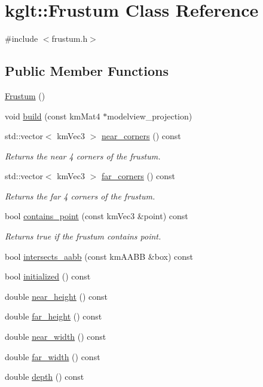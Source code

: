 \hypertarget{classkglt_1_1_frustum}{\section{kglt\-:\-:Frustum Class Reference}
\label{classkglt_1_1_frustum}
}


{\ttfamily \#include $<$frustum.\-h$>$}

\subsection*{Public Member Functions}
\begin{DoxyCompactItemize}
\item 
\hyperlink{classkglt_1_1_frustum_a830b594468c71f8d731b6ea89273225b}{Frustum} ()
\item 
void \hyperlink{classkglt_1_1_frustum_a4ee45311da6e2437dff483bf29f3171c}{build} (const km\-Mat4 $\ast$modelview\-\_\-projection)
\item 
std\-::vector$<$ km\-Vec3 $>$ \hyperlink{classkglt_1_1_frustum_a1cd3a93ac9f35d52c9d598a17eab7d0e}{near\-\_\-corners} () const 
\begin{DoxyCompactList}\small\item\em Returns the near 4 corners of the frustum. \end{DoxyCompactList}\item 
std\-::vector$<$ km\-Vec3 $>$ \hyperlink{classkglt_1_1_frustum_ab892628013e107e1769d9188e5e3b100}{far\-\_\-corners} () const 
\begin{DoxyCompactList}\small\item\em Returns the far 4 corners of the frustum. \end{DoxyCompactList}\item 
bool \hyperlink{classkglt_1_1_frustum_a45a748cec1712ca0689eba458296710c}{contains\-\_\-point} (const km\-Vec3 \&point) const 
\begin{DoxyCompactList}\small\item\em Returns true if the frustum contains point. \end{DoxyCompactList}\item 
bool \hyperlink{classkglt_1_1_frustum_a4b56eb4b0c05b947464f28d3f8819a85}{intersects\-\_\-aabb} (const km\-A\-A\-B\-B \&box) const 
\item 
bool \hyperlink{classkglt_1_1_frustum_a208f583257b58f731262778418300b50}{initialized} () const 
\item 
double \hyperlink{classkglt_1_1_frustum_aec3f3851b172fa1553f7687ac86b944c}{near\-\_\-height} () const 
\item 
double \hyperlink{classkglt_1_1_frustum_afa6ab68502feee7c7972e1ac9b493e9e}{far\-\_\-height} () const 
\item 
double \hyperlink{classkglt_1_1_frustum_a1be10edcc258f43cd26e47f13eacf7f6}{near\-\_\-width} () const 
\item 
double \hyperlink{classkglt_1_1_frustum_ae817949856355762eaee1fae6ad77b2b}{far\-\_\-width} () const 
\item 
double \hyperlink{classkglt_1_1_frustum_abc670ea75cea9f9784f1443d30db2643}{depth} () const 
\end{DoxyCompactItemize}


